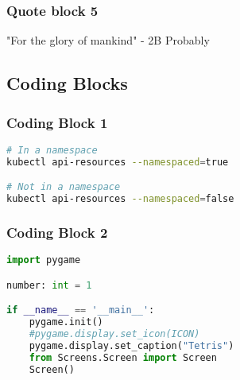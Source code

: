 \subsubsection{Quote block 5}

\lipsum[19]

\begin{center}
\begin{nierquote}
  "For the glory of mankind" - 2B Probably
\end{nierquote}
\end{center}

\lipsum[22]

\subsection{Coding Blocks}

\subsubsection{Coding Block 1}

\lipsum[23]

\begin{center}
\begin{minipage}{0.9\textwidth}
\begin{lstlisting}[language=bash]
# In a namespace
kubectl api-resources --namespaced=true

# Not in a namespace
kubectl api-resources --namespaced=false
\end{lstlisting}
\end{minipage}
\end{center}

\subsubsection{Coding Block 2}

\lipsum[24]

\begin{center}
\begin{minipage}{0.9\textwidth}
\begin{lstlisting}[language=python]
import pygame

number: int = 1

if __name__ == '__main__':
    pygame.init()
    #pygame.display.set_icon(ICON)
    pygame.display.set_caption("Tetris")
    from Screens.Screen import Screen
    Screen()
\end{lstlisting}
\end{minipage}
\end{center}